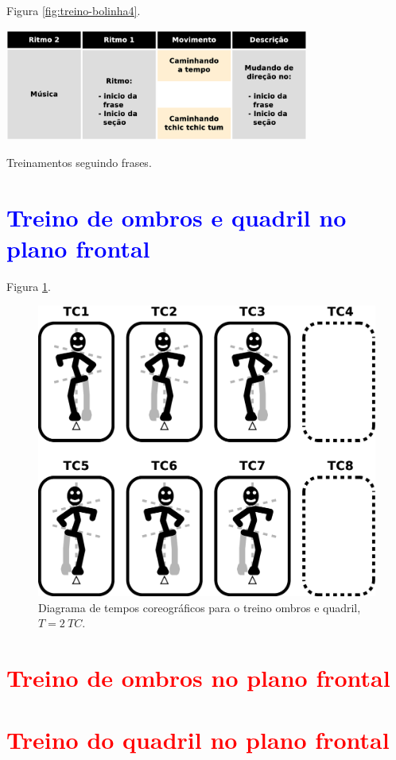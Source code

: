 Figura \ref{fig:treino-bolinha4}.

\begin{table}[!h]
  \centering
    \includegraphics[width=0.75\textwidth]{chapters/cap-body-control/treino-bolinha4.eps}
\caption{Treinamentos seguindo frases.}
\label{fig:treino-bolinha4}
\end{table}

\section{\textcolor{blue}{ Treino de ombros e quadril no plano frontal}}

Figura \ref{fig:pessoalombroquadril1}.

\begin{figure}[!h]
  \centering
    \includegraphics[width=\textwidth]{chapters/cap-body-control/postura-ombro1.eps}
\caption{Diagrama de tempos coreográficos para o treino ombros e quadril, $T=2~TC$.}
\label{fig:pessoalombroquadril1}
\end{figure}

\section{\textcolor{red}{  Treino de ombros no plano frontal}}

\section{\textcolor{red}{  Treino do quadril no plano frontal}}

